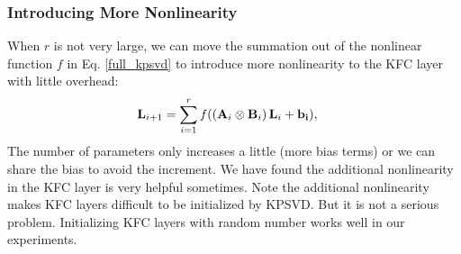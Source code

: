\documentclass{article}
\def\A{{\bf A}}
\def\B{{\bf B}}
\def\L{{\bf L}}
\begin{document}
\subsubsection{Introducing More Nonlinearity}
When $r$ is not very large, we can move the summation out of the nonlinear function $f$ in Eq. \eqref{full_kpsvd} to introduce more nonlinearity to the KFC layer with little overhead:
\begin{align}
\begin{split}
\L_{i+1} & = \sum_{i=1}^{r} f(\left(\A_{i} \otimes \B_{i}\right) \L_{i} + \bf{b}_i),
\end{split}
\end{align}
The number of parameters only increases a little (more bias terms) or we can share the bias to avoid the increment. We have found the additional nonlinearity in the KFC layer  is very helpful sometimes.
Note the additional nonlinearity makes KFC layers difficult to be initialized by KPSVD. But it is not a serious problem. Initializing KFC layers with random number works well in our experiments.
\end{document}
